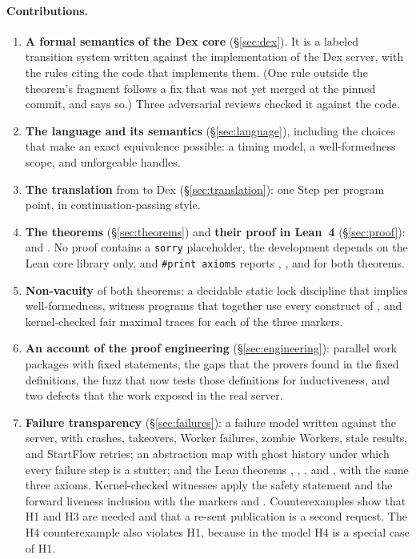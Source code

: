 \paragraph{Contributions.}
\begin{enumerate}
\item \textbf{A formal semantics of the Dex core}
  (\S\ref{sec:dex}). It is a labeled transition system written against the
  implementation of the Dex server, with the rules citing the code that
  implements them. (One rule outside the theorem's fragment follows a fix
  that was not yet merged at the pinned commit, and says so.) Three
  adversarial reviews checked it against the code.
\item \textbf{The language \Lang{} and its semantics}
  (\S\ref{sec:language}), including the choices that make an exact
  equivalence possible: a timing model, a well-formedness scope, and
  unforgeable handles.
\item \textbf{The translation} from \Lang{} to Dex
  (\S\ref{sec:translation}): one Step per program point, in
  continuation-passing style.
\item \textbf{The theorems} (\S\ref{sec:theorems}) and \textbf{their proof
  in Lean~4} (\S\ref{sec:proof}):  and
  . No proof contains a \texttt{sorry}
  placeholder, the development depends on the Lean core library only, and
  \texttt{\#print axioms} reports
  , , and  for both
  theorems.
\item \textbf{Non-vacuity} of both theorems: a decidable static lock
  discipline that implies well-formedness, witness programs that together
  use every construct of \Lang{}, and kernel-checked fair maximal traces
  for each of the three markers.
\item \textbf{An account of the proof engineering}
  (\S\ref{sec:engineering}): parallel work packages with fixed statements,
  the gaps that the provers found in the fixed definitions, the fuzz that
  now tests those definitions for inductiveness, and two defects that the
  work exposed in the real server.
\item \textbf{Failure transparency} (\S\ref{sec:failures}): a failure
  model written against the server, with crashes, takeovers, Worker
  failures, zombie Workers, stale results, and StartFlow retries; an
  abstraction map with ghost history under which every failure step is a
  stutter; and the Lean theorems ,
  , , and
  , with the same three axioms. Kernel-checked
  witnesses apply the safety statement and the forward liveness inclusion
  with the markers \mterm{} and \mdead{}. Counterexamples show that H1
  and H3 are needed and that a re-sent publication is a second request.
  The H4 counterexample also violates H1, because in the model H4 is a
  special case of H1.
\end{enumerate}

